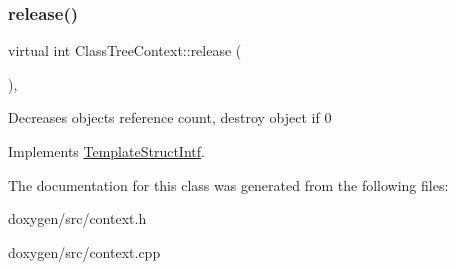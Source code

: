 \mbox{\label{class_class_tree_context_a2a946d5d9d5170215eed8d69c5d51fc6}} 
\subsubsection{\texorpdfstring{release()}{release()}}
{\footnotesize\ttfamily virtual int Class\+Tree\+Context\+::release (\begin{DoxyParamCaption}{ }\end{DoxyParamCaption})\hspace{0.3cm}{\ttfamily [inline]}, {\ttfamily [virtual]}}

Decreases object\textquotesingle{}s reference count, destroy object if 0 

Implements \mbox{\hyperlink{class_template_struct_intf_a3dce7dd29d3f66a8080b40578e8a5045}{Template\+Struct\+Intf}}.



The documentation for this class was generated from the following files\+:\begin{DoxyCompactItemize}
\item 
doxygen/src/context.\+h\item 
doxygen/src/context.\+cpp\end{DoxyCompactItemize}
